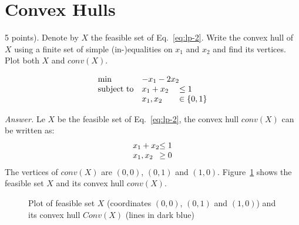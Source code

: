 \documentclass[10pt]{article}
\newenvironment{exercise}[2][Exercise]{\begin{trivlist}
  \item[\hskip \labelsep {\bfseries #1}\hskip \labelsep {\bfseries #2.}]}{\end{trivlist}}
\begin{document}
\section{Convex Hulls}
\begin{exercise}{3}

(5 points). Denote by $X$ the feasible set of Eq.~\ref{eq:lp-2}. Write the
convex hull of $X$ using a finite set of simple (in-)equalities on $x_1$ and $x_2$ and find its vertices. Plot both $X$ and $conv(X)$.

\begin{equation}\label{eq:lp-2}
\begin{array}{ll@{}ll}
\text{min}  &-x_1 - 2x_2\\
\text{subject to} 
& x_1+x_2 &\leq 1 \\
&x_1,x_2 &\in \{0,1\}
\end{array}
\end{equation}

\textit{Answer.}
Le $X$ be the feasible set of Eq.~\ref{eq:lp-2}, the convex hull $conv(X)$ can be written as: 
\begin{equation}\label{eq:convex-hull}
\begin{array}{l@{}ll}
 x_1 + x_2 &\leq 1 \\
 x_1,x_2  &\geq 0 \\ 
 \end{array}
\end{equation}
The vertices of $conv(X)$ are $(0, 0)$, $(0, 1)$ and $(1, 0 )$. Figure~\ref{fig:hull} shows the feasible set $X$ and its convex hull $conv(X)$.

\begin{figure}[!ht]
  \centering



 \caption{Plot of feasible set $X$ (coordinates $(0, 0)$, $(0, 1)$ and $(1, 0 )$) and its convex hull $Conv(X)$ (lines in dark blue)}
  \vspace{-3mm}
  \label{fig:hull}
\end{figure}

\end{exercise}
\end{document}
